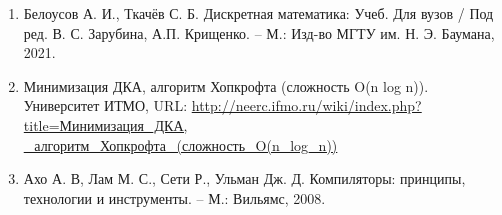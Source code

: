 \documentclass{bmstu-gost-7-32}
\begin{document}
\begin{enumerate}
	\item Белоусов А. И., Ткачёв С. Б. Дискретная математика: Учеб. Для вузов / Под ред. В. С. Зарубина, А.П. Крищенко. – М.: Изд-во МГТУ им. Н. Э. Баумана, 2021.
	\item Минимизация ДКА, алгоритм Хопкрофта (сложность O(n log n)). Университет ИТМО, URL: \href{http://neerc.ifmo.ru/wiki/index.php?title=\%D0\%9C\%D0\%B8\%D0\%BD\%D0\%B8\%D0\%BC\%D0\%B8\%D0\%B7\%D0\%B0\%D1\%86\%D0\%B8\%D1\%8F_\%D0\%94\%D0\%9A\%D0\%90,_\%D0\%B0\%D0\%BB\%D0\%B3\%D0\%BE\%D1\%80\%D0\%B8\%D1\%82\%D0\%BC_\%D0\%A5\%D0\%BE\%D0\%BF\%D0\%BA\%D1\%80\%D0\%BE\%D1\%84\%D1\%82\%D0\%B0_(\%D1\%81\%D0\%BB\%D0\%BE\%D0\%B6\%D0\%BD\%D0\%BE\%D1\%81\%D1\%82\%D1\%8C_O(n_log_n))}{http://neerc.ifmo.ru/wiki/index.php?title=Минимизация\_ДКА,\\\_алгоритм\_Хопкрофта\_(сложность\_O(n\_log\_n))}
	\item Ахо А. В, Лам М. С., Сети Р., Ульман Дж. Д. Компиляторы: принципы, технологии и инструменты. – М.: Вильямс, 2008.
\end{enumerate}
\end{document}
